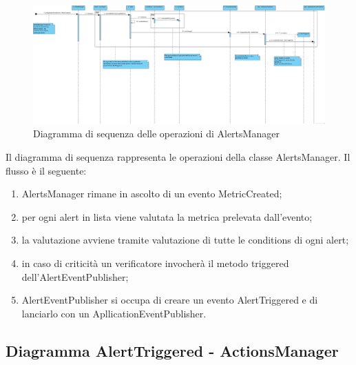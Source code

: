         \begin{figure}[htbp]
            \centering
            \includegraphics[width=\textwidth]{./img/DiagrammiSequenza/alertsManager.png}
            \caption[Diagramma di sequenza MetricCreated - AlertsManager]{Diagramma di sequenza delle operazioni di AlertsManager}
        \end{figure}
        Il diagramma di sequenza rappresenta le operazioni della classe AlertsManager. Il flusso è il seguente:
        \begin{enumerate}
        	\item AlertsManager rimane in ascolto di un evento MetricCreated;
        	\item per ogni alert in lista viene valutata la metrica prelevata dall'evento;
        	\item la valutazione avviene tramite valutazione di tutte le conditions di ogni alert;
        	\item in caso di criticità un verificatore invocherà il metodo triggered dell'AlertEventPublisher;
        	\item AlertEventPublisher si occupa di creare un evento AlertTriggered e di lanciarlo con un ApllicationEventPublisher.
        \end{enumerate}
        
    \newpage

    \subsection{Diagramma AlertTriggered - ActionsManager}


